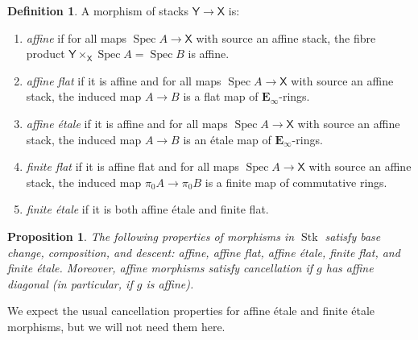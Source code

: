 \documentclass[11pt, a4paper]{article}
\DeclareMathOperator{\Spec}{Spec}
\newcommand{\1}{\mathbf{1}}
\newcommand{\Sph}{\mathbf{S}}
\DeclareMathOperator{\Stk}{Stk}
\newcommand{\E}{\mathbf{E}}
\newcommand{\X}{\mathsf{X}}
\newcommand{\Y}{\mathsf{Y}}
\theoremstyle{plain}
\newtheorem{prop}[equation]{Proposition}
\theoremstyle{definition}
\newtheorem{mydef}[equation]{Definition}
\theoremstyle{remark}\numberwithin{equation}{section}
\begin{document}
\begin{mydef}\label{df:definition_of_morphisms_of_stacks}
    A morphism of stacks $\Y \to \X$ is:
    \begin{enumerate}
        \item \emph{affine} if for all maps $\Spec A \to \X$ with source an affine stack, the fibre product $\Y \times_\X \Spec A = \Spec B$ is affine.
        \item \emph{affine flat} if it is affine and for all maps $\Spec A \to \X$ with source an affine stack, the induced map $A \to B$ is a flat map of $\E_\infty$-rings.
        \item \emph{affine étale} if it is affine and for all maps $\Spec A \to \X$ with source an affine stack, the induced map $A \to B$ is an étale map of $\E_\infty$-rings.
        \item \emph{finite flat} if it is affine flat and for all maps $\Spec A \to \X$ with source an affine stack, the induced map $\pi_0 A \to \pi_0 B$ is a finite map of commutative rings.
        \item \emph{finite étale} if it is both affine étale and finite flat.
    \end{enumerate}
\end{mydef}

\begin{prop}\label{pr:permanenceproperties_for_morphisms}
    The following properties of morphisms in $\Stk$ satisfy base change, composition, and descent: affine, affine flat, affine étale, finite flat, and finite étale. Moreover, affine morphisms satisfy cancellation if $g$ has affine diagonal (in particular, if $g$ is affine).
\end{prop}

We expect the usual cancellation properties for affine étale and finite étale morphisms, but we will not need them here.
\end{document}
